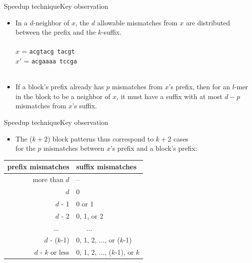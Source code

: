 \documentclass[pdf,xcolor={dvipsnames}]{beamer}
\begin{document}
	\begin{frame}{Speedup technique}{Key observation}
		\begin{itemize}
			\item In a $d$-neighbor of $x$, the $d$ allowable mismatches from $x$ are distributed between the prefix and the $k$-suffix.\\\ \\
			{\large\centering
				$x$  = \texttt{acgtacg tacgt}\\
				$x'$ = \texttt{acg{\color{red}a}a{\color{red}aa} t{\color{red}c}cg{\color{red}a}}\\\ \\
			}
			\item If a {block's prefix already has $p$ mismatches} from $x$'s prefix, then for an $l$-mer in the block to be a neighbor of $x$, it must have a { suffix with at most $d-p$ mismatches} from $x$'s suffix.
		\end{itemize}
		\end{frame}
	\begin{frame}{Speedup technique}{Key observation}
		\begin{itemize}
			\item The ($k+2$) block patterns thus correspond to $k+2$ cases\\ for the $p$ mismatches between $x$'s prefix and a block's prefix:
		\end{itemize}
			\begin{table}
			\renewcommand{\arraystretch}{1.3}
			\label{tbl:runtimes_v_pms}
			\centering
			\begin{tabular}{|r|l|}
			\hline
			\bfseries prefix mismatches & \bfseries suffix mismatches\\
			\hline
			more than $d$ 	& --\\
			$d$ 		& 0 \\
			$d$ - 1 	& 0 or 1 \\
			$d$ - 2 	& 0, 1, or 2 \\
			...\ \ \	& \ \ \ ...\\
			$d$ - ($k$-1) 	& 0, 1, 2, ..., or ($k$-1) \\
			$d$ - $k$ or less 	& 0, 1, 2, ..., ($k$-1), or $k$ \\
			\hline
			\end{tabular}
		\end{table}

	\end{frame}
\end{document}
